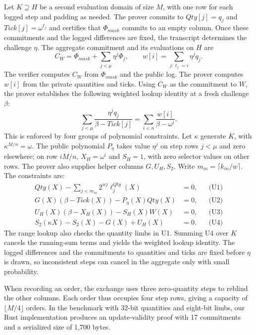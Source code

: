 Let \(K\supseteq H\) be a second evaluation domain of size \(M\), with one row for each logged step and padding as needed. The prover commits to \(Qty[j]=q_j\) and \(Tick[j]=\omega^{\ell_j}\) and certifies that \(\Phi_{mask}\) commits to an empty column. Once these commitments and the logged differences are fixed, the transcript determines the challenge \(\eta\). The aggregate commitment and its evaluations on \(H\) are
\[
C_W=\Phi_{mask}+\sum_{j<\mu}\eta^j\Phi_j,
\qquad w[i]=\sum_{j:\ell_j=i}\eta^j q_j.
\]
The verifier computes \(C_W\) from \(\Phi_{mask}\) and the public log. The prover computes \(w[i]\) from the private quantities and ticks. Using \(C_W\) as the commitment to \(W\), the prover establishes the following weighted lookup identity at a fresh challenge \(\beta\):
\[
\sum_{j<\mu}\frac{\eta^j q_j}{\beta-Tick[j]}
=\sum_{i<n}\frac{w[i]}{\beta-\omega^i}.
\]
This is enforced by four groups of polynomial constraints. Let \(\kappa\) generate \(K\), with \(\kappa^{M/n}=\omega\). The public polynomial \(P_\eta\) takes value \(\eta^j\) on step rows \(j<\mu\) and zero elsewhere; on row \(iM/n\), \(X_H=\omega^i\) and \(S_H=1\), with zero selector values on other rows. The prover also supplies helper columns \(G,U_H,S_2\). Write \(m_{in}=\lceil k_{in}/w\rceil\). The constraints are:
\[
\begin{aligned}
Qty(X)-\sum_{j<m_{in}}2^{wj}\ell_j^{Qty}(X)&=0, &&\text{(U1)}\\
G(X)(\beta-Tick(X))-P_\eta(X)Qty(X)&=0, &&\text{(U2)}\\
U_H(X)(\beta-X_H(X))-S_H(X)W(X)&=0, &&\text{(U3)}\\
S_2(\kappa X)-S_2(X)-G(X)+U_H(X)&=0. &&\text{(U4)}
\end{aligned}
\]
The range lookup also checks the quantity limbs in U1. Summing U4 over \(K\) cancels the running-sum terms and yields the weighted lookup identity. The logged differences and the commitments to quantities and ticks are fixed before \(\eta\) is drawn, so inconsistent steps can cancel in the aggregate only with small probability.

When recording an order, the exchange uses three zero-quantity steps to reblind the other columns. Each order thus occupies four step rows, giving a capacity of \(\lfloor M/4\rfloor\) orders. In the benchmark with 32-bit quantities and eight-bit limbs, our Rust implementation produces an update-validity proof with 17 commitments and a serialized size of 1,700 bytes.


